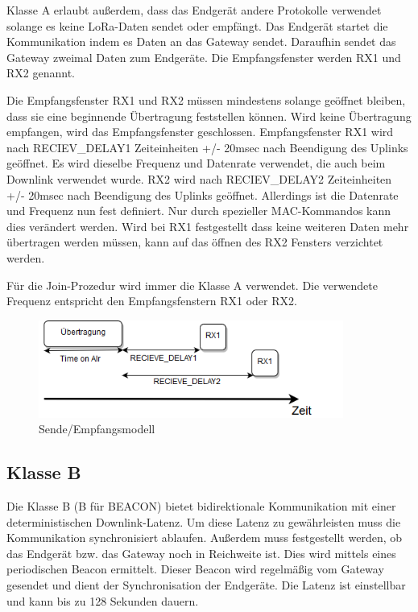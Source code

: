 \documentclass[a4paper, 12pt]{article}
\begin{document}
            Klasse A erlaubt außerdem, dass das Endgerät andere Protokolle verwendet solange es keine LoRa-Daten sendet 
            oder empfängt. \cite[S.11 ff.]{LoRaSpec} Das Endgerät startet 
            die Kommunikation indem es Daten an das Gateway sendet. Daraufhin sendet das Gateway zweimal 
            Daten zum Endgeräte. Die Empfangsfenster werden RX1 und RX2 genannt. 

            Die Empfangsfenster RX1 und RX2 müssen mindestens solange geöffnet bleiben, dass sie eine beginnende 
            Übertragung feststellen können. Wird keine Übertragung empfangen, wird das Empfangsfenster 
            geschlossen. Empfangsfenster RX1 wird nach RECIEV\_DELAY1 Zeiteinheiten +/- 20msec nach Beendigung des 
            Uplinks geöffnet. Es wird dieselbe Frequenz und Datenrate verwendet, die auch beim Downlink verwendet 
            wurde. 
            RX2 wird nach RECIEV\_DELAY2 Zeiteinheiten +/- 20msec nach Beendigung des Uplinks geöffnet. Allerdings
            ist die Datenrate und Frequenz nun fest definiert. Nur durch spezieller MAC-Kommandos kann dies verändert werden.
            Wird bei RX1 festgestellt dass keine weiteren Daten mehr übertragen werden müssen, 
            kann auf das öffnen des RX2 Fensters verzichtet werden.
            
            Für die Join-Prozedur wird immer die Klasse A verwendet. Die verwendete Frequenz entspricht den 
            Empfangsfenstern RX1 oder RX2.

            \begin{figure}[ht]
                \centering
                \includegraphics[width=10cm]{KlasseA}
                \caption{Sende/Empfangsmodell}
            \end{figure}
 
        \subsection{Klasse B}
            Die Klasse B (B für BEACON) bietet bidirektionale Kommunikation mit einer deterministischen Downlink-Latenz.
            Um diese Latenz zu gewährleisten muss die Kommunikation synchronisiert ablaufen. Außerdem muss 
            festgestellt werden, ob das Endgerät bzw. das Gateway noch in Reichweite ist. Dies wird mittels eines 
            periodischen Beacon ermittelt. Dieser Beacon wird regelmäßig vom Gateway gesendet und dient der 
            Synchronisation der Endgeräte. Die Latenz ist einstellbar und kann 
            bis zu 128 Sekunden dauern.\cite[S.66 ff.]{LoRaSpec}
\end{document}
